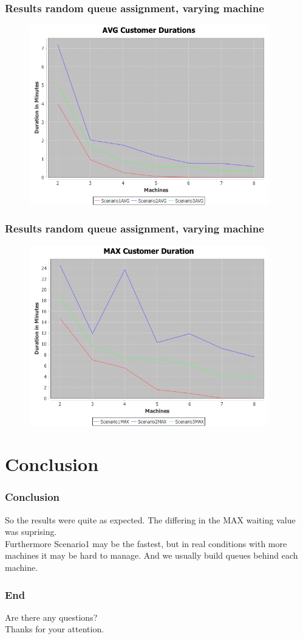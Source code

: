 \documentclass{beamer}
\begin{document}
\begin{frame}
\frametitle{Results random queue assignment, varying machine}
\begin{figure}
\centering
\includegraphics[width=0.93\textwidth]{results/Output_AVG_random_true.png}
\end{figure}
\end{frame}

\begin{frame}
\frametitle{Results random queue assignment, varying machine}
\begin{figure}
\centering
\includegraphics[width=0.93\textwidth]{results/Output_MAX_random_true.png}
\end{figure}
\end{frame}

\section{Conclusion}
\begin{frame}
\frametitle{Conclusion}
So the results were quite as expected. The differing in the MAX waiting value was suprising. \\
Furthermore Scenario1 may be the fastest, but in real conditions with more machines it may be hard to manage. And we usually build queues behind each machine.
\end{frame}

\begin{frame}
\frametitle{End}
Are there any questions? \\
Thanks for your attention.
\end{frame}
\end{document}
